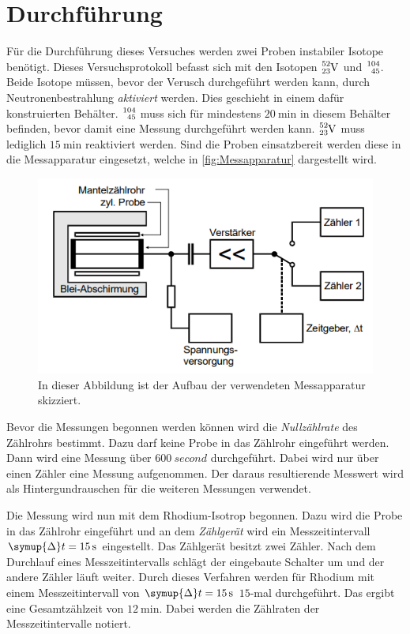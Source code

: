 \section{Durchführung}
\label{sec:Durchführung}
Für die Durchführung dieses Versuches werden zwei Proben instabiler Isotope benötigt. Dieses Versuchsprotokoll befasst sich mit den Isotopen $\ce{^{52}_{23}V}$ und 
$\ce{^{104}_{45}}$. Beide Isotope müssen, bevor der Verusch durchgeführt werden kann, durch Neutronenbestrahlung \textit{aktiviert} werden. Dies geschieht in einem dafür
konstruierten Behälter. $\ce{^{104}_{45}}$ muss sich für mindestens $\qty{20}{\minute}$ in diesem Behälter befinden, bevor damit eine Messung durchgeführt werden kann. 
$\ce{^{52}_{23}V}$ muss lediglich $\qty{15}{\minute}$ reaktiviert werden. Sind die Proben einsatzbereit werden diese in die Messapparatur eingesetzt, welche in
\autoref{fig:Messapparatur} dargestellt wird.  

\begin{figure}
    \centering
    \includegraphics[width = .7\textwidth]{content/Skizzeapparatur.png}
    \caption{In dieser Abbildung ist der Aufbau der verwendeten Messapparatur skizziert. \cite{v702}}
    \label{fig:Messapparatur}
\end{figure}

Bevor die Messungen begonnen werden können wird die \textit{Nullzählrate} des Zählrohrs bestimmt. Dazu darf keine Probe in das Zählrohr eingeführt werden. Dann wird eine Messung 
über $\qty{600}{second}$ durchgeführt. Dabei wird nur über einen Zähler eine Messung aufgenommen. Der daraus resultierende Messwert wird als Hintergundrauschen für die weiteren
Messungen verwendet.

Die Messung wird nun mit dem Rhodium-Isotrop begonnen. Dazu wird die Probe in das Zählrohr eingeführt und an dem \textit{Zählgerät} wird ein Messzeitintervall 
$\symup{\Delta}t = \qty{15}{\second}$ eingestellt. Das Zählgerät besitzt zwei Zähler. Nach dem Durchlauf eines Messzeitintervalls schlägt der eingebaute Schalter um und der 
andere Zähler läuft weiter. Durch dieses Verfahren werden für Rhodium mit einem Messzeitintervall von $\symup{\Delta}t = \qty{15}{\second}$ $\num{15}$-mal durchgeführt. Das 
ergibt eine Gesamtzählzeit von $\qty{12}{\minute}$. Dabei werden die Zählraten der Messzeitintervalle notiert. 

